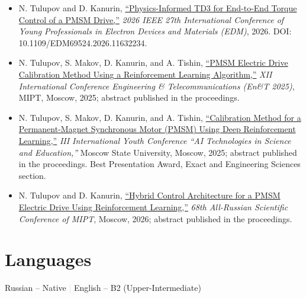 \documentclass[10pt,a4paper]{article}
\begin{document}
\begin{itemize}
  \item N. Tulupov and D. Kanurin,
        \href{https://doi.org/10.1109/EDM69524.2026.11632234}{``Physics-Informed TD3 for End-to-End Torque Control of a PMSM Drive,''}
        \textit{2026 IEEE 27th International Conference of Young Professionals in
        Electron Devices and Materials (EDM)}, 2026.
        DOI: 10.1109/EDM69524.2026.11632234.
  \item N. Tulupov, S. Makov, D. Kanurin, and A. Tishin,
        \href{https://www.elibrary.ru/item.asp?id=90362673}{``PMSM Electric Drive Calibration Method Using a Reinforcement Learning Algorithm,''}
        \textit{XII International Conference Engineering \& Telecommunications
        (En\&T 2025)}, MIPT, Moscow, 2025; abstract published in the proceedings.
  \item N. Tulupov, S. Makov, D. Kanurin, and A. Tishin,
        \href{https://www.elibrary.ru/item.asp?id=89026196}{``Calibration Method for a Permanent-Magnet Synchronous Motor (PMSM) Using Deep Reinforcement Learning,''}
        \textit{III International Youth Conference ``AI Technologies in Science
        and Education,''} Moscow State University, Moscow, 2025; abstract
        published in the proceedings. Best Presentation Award, Exact and
        Engineering Sciences section.
  \item N. Tulupov and D. Kanurin,
        \href{https://mipt.ru/upload/\%D0\%9E\%D0\%9A\%D0\%9F\%D0\%98/01\%20\%D0\%A4\%D0\%A0\%D0\%9A\%D0\%A2-2026.pdf}{``Hybrid Control Architecture for a PMSM Electric Drive Using Reinforcement Learning,''}
        \textit{68th All-Russian Scientific Conference of MIPT}, Moscow, 2026;
        abstract published in the proceedings.
\end{itemize}

\section{Languages}

Russian -- Native \hspace{1.4em}\textcolor{lightgray}{|}\hspace{1.4em}
English -- B2 (Upper-Intermediate)
\end{document}
